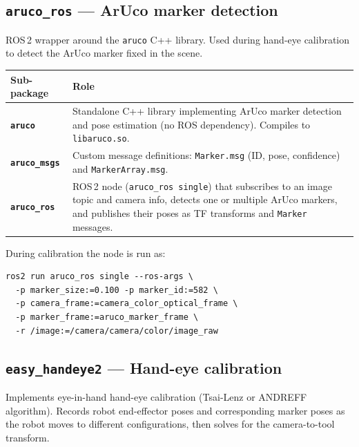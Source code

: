 \documentclass[11pt,a4paper]{article}
\newcommand{\pkg}[1]{\texttt{\textbf{#1}}}
\begin{document}
\subsection{\texttt{aruco\_ros} --- ArUco marker detection}

ROS\,2 wrapper around the \texttt{aruco} C++ library. Used during
hand-eye calibration to detect the ArUco marker fixed in the scene.

\begin{center}
\begin{tabular}{|l|p{9cm}|}
\hline
\textbf{Sub-package} & \textbf{Role} \\
\hline
\pkg{aruco} &
  Standalone C++ library implementing ArUco marker detection and pose
  estimation (no ROS dependency). Compiles to \texttt{libaruco.so}. \\
\hline
\pkg{aruco\_msgs} &
  Custom message definitions: \texttt{Marker.msg} (ID, pose, confidence)
  and \texttt{MarkerArray.msg}. \\
\hline
\pkg{aruco\_ros} &
  ROS\,2 node (\texttt{aruco\_ros single}) that subscribes to an image
  topic and camera info, detects one or multiple ArUco markers, and
  publishes their poses as TF transforms and \texttt{Marker} messages. \\
\hline
\end{tabular}
\end{center}

During calibration the node is run as:
\begin{verbatim}
ros2 run aruco_ros single --ros-args \
  -p marker_size:=0.100 -p marker_id:=582 \
  -p camera_frame:=camera_color_optical_frame \
  -p marker_frame:=aruco_marker_frame \
  -r /image:=/camera/camera/color/image_raw
\end{verbatim}

\subsection{\texttt{easy\_handeye2} --- Hand-eye calibration}

Implements eye-in-hand hand-eye calibration (Tsai-Lenz or ANDREFF algorithm).
Records robot end-effector poses and corresponding marker poses as the robot
moves to different configurations, then solves for the camera-to-tool transform.
\end{document}
